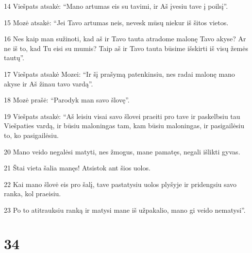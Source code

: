 \par 14 Viešpats atsakė: “Mano artumas eis su tavimi, ir Aš įvesiu tave į poilsį”. 
\par 15 Mozė atsakė: “Jei Tavo artumas neis, nevesk mūsų niekur iš šitos vietos. 
\par 16 Nes kaip man sužinoti, kad aš ir Tavo tauta atradome malonę Tavo akyse? Ar ne iš to, kad Tu eisi su mumis? Taip aš ir Tavo tauta būsime išskirti iš visų žemės tautų”. 
\par 17 Viešpats atsakė Mozei: “Ir šį prašymą patenkinsiu, nes radai malonę mano akyse ir Aš žinau tavo vardą”. 
\par 18 Mozė prašė: “Parodyk man savo šlovę”. 
\par 19 Viešpats atsakė: “Aš leisiu visai savo šlovei praeiti pro tave ir paskelbsiu tau Viešpaties vardą, ir būsiu maloningas tam, kam būsiu maloningas, ir pasigailėsiu to, ko pasigailėsiu. 
\par 20 Mano veido negalėsi matyti, nes žmogus, mane pamatęs, negali išlikti gyvas. 
\par 21 Štai vieta šalia manęs! Atsistok ant šios uolos. 
\par 22 Kai mano šlovė eis pro šalį, tave pastatysiu uolos plyšyje ir pridengsiu savo ranka, kol praeisiu. 
\par 23 Po to atitrauksiu ranką ir matysi mane iš užpakalio, mano gi veido nematysi”.



\chapter{34}

